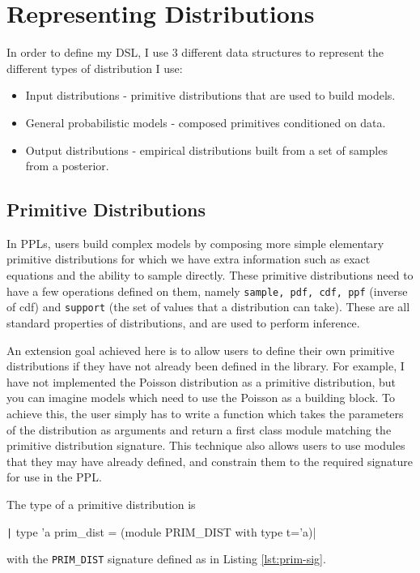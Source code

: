\documentclass[sigconf]{acmart}
\begin{document}
\section{Representing Distributions}
In order to define my DSL, I use 3 different data structures to represent the different types of distribution I use:
\begin{itemize}
\item Input distributions - primitive distributions that are used to build models.
\item General probabilistic models - composed primitives conditioned on data.
\item Output distributions - empirical distributions built from a set of samples from a posterior.
\end{itemize}
\vspace{2mm}
\subsection{Primitive Distributions}
In PPLs, users build complex models by composing more simple elementary primitive distributions for which we have extra information such as exact equations and the ability to sample directly. These primitive distributions need to have a few operations defined on them, namely \texttt{sample, pdf, cdf, ppf} (inverse of cdf) and \texttt{support} (the set of values that a distribution can take). These are all standard properties of distributions, and are used to perform inference.

An extension goal achieved here is to allow users to define their own primitive distributions if they have not already been defined in the library. For example, I have not implemented the Poisson distribution as a primitive distribution, but you can imagine models which need to use the Poisson as a building block. To achieve this, the user simply has to write a function which takes the parameters of the distribution as arguments and return a first class module matching the primitive distribution signature. This technique also allows users to use modules that they may have already defined, and constrain them to the required signature for use in the PPL.

The type of a primitive distribution is
\begin{center}
  \texttt| type 'a prim_dist = (module PRIM_DIST with type t='a)|
\end{center}
with the \texttt{PRIM\_DIST} signature defined as in Listing \ref{lst:prim-sig}.
\end{document}
